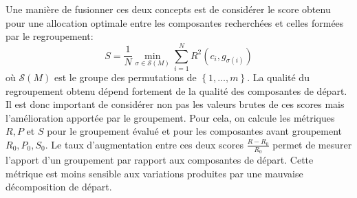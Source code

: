 \documentclass{gretsi}
\newcommand{\set}[1]{\left \{ 1, \dots, #1 \right \}}
\begin{document}
    Une manière de fusionner ces deux concepts est de considérer le score obtenu pour une allocation optimale entre les composantes recherchées et celles formées par le regroupement:
    \begin{equation}
        S =  \frac{1}{N} \min_{\sigma \in \mathcal S(M)} \sum_{i=1}^N R^2(c_i, g_{\sigma(i)})
    \end{equation}
    où $\mathcal S(M)$ est le groupe des permutations de $\set{m}$.
    La qualité du regroupement obtenu dépend fortement de la qualité des composantes de départ.
    Il est donc important de considérer non pas les valeurs brutes de ces scores mais l'amélioration apportée par le groupement.
    Pour cela, on calcule les métriques $R, P$ et $S$ pour le groupement évalué et pour les composantes avant groupement $R_0, P_0, S_0$.
    Le taux d'augmentation entre ces deux scores $\frac{R-R_0}{R_0}$ permet de mesurer l'apport d'un groupement par rapport aux composantes de départ.
    Cette métrique est moins sensible aux variations produites par une mauvaise décomposition de départ.
    

% 
    


    
\end{document}
